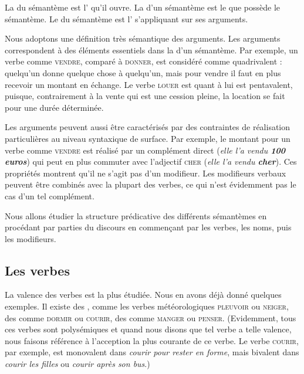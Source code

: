 {La  du sémantème est l’ qu’il ouvre. La  d’un sémantème est le  que possède le sémantème. Le  du sémantème est l’ s’appliquant sur ses arguments.}

Nous adoptons une définition très sémantique des arguments. Les arguments correspondent à des éléments essentiels dans la  d’un sémantème. Par exemple, un verbe comme \textsc{vendre}, comparé à \textsc{donner}, est considéré comme quadrivalent : quelqu’un donne quelque chose à quelqu’un, mais pour vendre il faut en plus recevoir un montant en échange. Le verbe \textsc{louer} est quant à lui est pentavalent, puisque, contrairement à la vente qui est une cession pleine, la location se fait pour une durée déterminée.

Les arguments peuvent aussi être caractérisés par des contraintes de réalisation particulières au niveau syntaxique de surface. Par exemple, le montant pour un verbe comme \textsc{vendre} est réalisé par un complément direct (\textit{elle l’a vendu \textbf{100 euros}}) qui peut en plus commuter avec l’adjectif \textsc{cher} (\textit{elle l’a vendu \textbf{cher}}). Ces propriétés montrent qu’il ne s’agit pas d’un modifieur. Les modifieurs verbaux peuvent être combinés avec la plupart des verbes, ce qui n’est évidemment pas le cas d’un tel complément.

Nous allons étudier la structure prédicative des différents sémantèmes en procédant par parties du discours en commençant par les verbes, les noms, puis les modifieurs.

\subsection{Les verbes}
La valence des verbes est la plus étudiée. Nous en avons déjà donné quelques exemples. Il existe des , comme les verbes météorologiques \textsc{pleuvoir} ou \textsc{neiger}, des  comme \textsc{dormir} ou \textsc{courir}, des  comme \textsc{manger} ou \textsc{penser}. (Evidemment, tous ces verbes sont polysémiques et quand nous disons que tel verbe a telle valence, nous faisons référence à l’acception la plus courante de ce verbe. Le verbe \textsc{courir}, par exemple, est monovalent dans \textit{courir pour rester en forme}, mais bivalent dans \textit{courir les filles} ou \textit{courir après son bus}.) 

